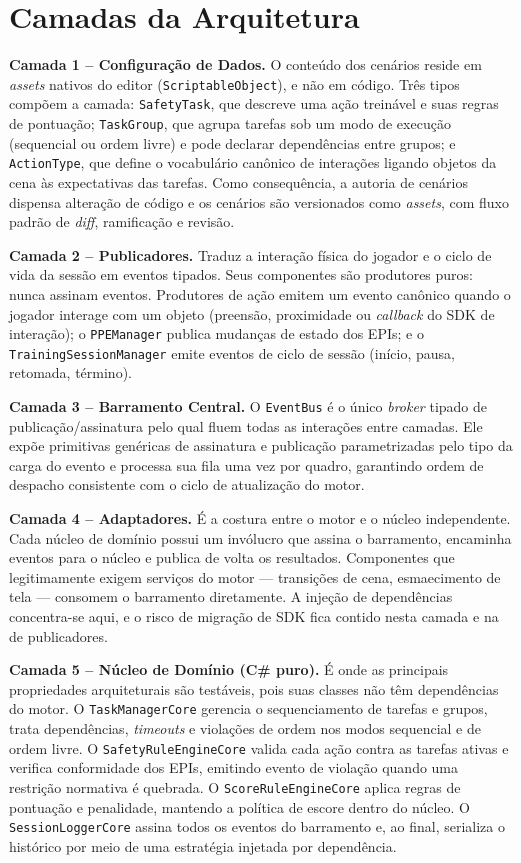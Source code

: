 \section{Camadas da Arquitetura}

\textbf{Camada 1 -- Configuração de Dados.} O conteúdo dos cenários reside em \textit{assets} nativos do editor (\texttt{ScriptableObject}), e não em código. Três tipos compõem a camada: \texttt{SafetyTask}, que descreve uma ação treinável e suas regras de pontuação; \texttt{TaskGroup}, que agrupa tarefas sob um modo de execução (sequencial ou ordem livre) e pode declarar dependências entre grupos; e \texttt{ActionType}, que define o vocabulário canônico de interações ligando objetos da cena às expectativas das tarefas. Como consequência, a autoria de cenários dispensa alteração de código e os cenários são versionados como \textit{assets}, com fluxo padrão de \textit{diff}, ramificação e revisão.

\textbf{Camada 2 -- Publicadores.} Traduz a interação física do jogador e o ciclo de vida da sessão em eventos tipados. Seus componentes são produtores puros: nunca assinam eventos. Produtores de ação emitem um evento canônico quando o jogador interage com um objeto (preensão, proximidade ou \textit{callback} do SDK de interação); o \texttt{PPEManager} publica mudanças de estado dos EPIs; e o \texttt{TrainingSessionManager} emite eventos de ciclo de sessão (início, pausa, retomada, término).

\textbf{Camada 3 -- Barramento Central.} O \texttt{EventBus} é o único \textit{broker} tipado de publicação/assinatura pelo qual fluem todas as interações entre camadas. Ele expõe primitivas genéricas de assinatura e publicação parametrizadas pelo tipo da carga do evento e processa sua fila uma vez por quadro, garantindo ordem de despacho consistente com o ciclo de atualização do motor.

\textbf{Camada 4 -- Adaptadores.} É a costura entre o motor e o núcleo independente. Cada núcleo de domínio possui um invólucro que assina o barramento, encaminha eventos para o núcleo e publica de volta os resultados. Componentes que legitimamente exigem serviços do motor --- transições de cena, esmaecimento de tela --- consomem o barramento diretamente. A injeção de dependências concentra-se aqui, e o risco de migração de SDK fica contido nesta camada e na de publicadores.

\textbf{Camada 5 -- Núcleo de Domínio (C\# puro).} É onde as principais propriedades arquiteturais são testáveis, pois suas classes não têm dependências do motor. O \texttt{TaskManagerCore} gerencia o sequenciamento de tarefas e grupos, trata dependências, \textit{timeouts} e violações de ordem nos modos sequencial e de ordem livre. O \texttt{SafetyRuleEngineCore} valida cada ação contra as tarefas ativas e verifica conformidade dos EPIs, emitindo evento de violação quando uma restrição normativa é quebrada. O \texttt{ScoreRuleEngineCore} aplica regras de pontuação e penalidade, mantendo a política de escore dentro do núcleo. O \texttt{SessionLoggerCore} assina todos os eventos do barramento e, ao final, serializa o histórico por meio de uma estratégia injetada por dependência.

